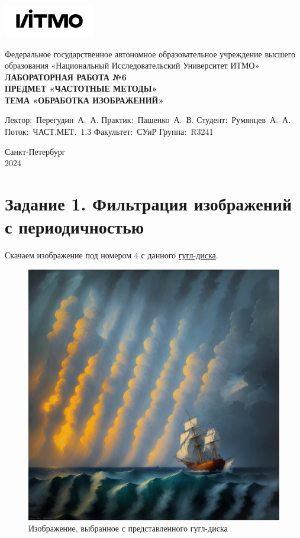 \documentclass[a4paper, 12pt]{article}
\begin{document}
    \begin{titlepage}

        \begin{center}
        \includegraphics[width=0.3\textwidth]{itmo.png} %
        \vfill

        Федеральное государственное автономное образовательное учреждение высшего образования
        «Национальный Исследовательский Университет ИТМО»\\

        \vfill
        {\large\bf ЛАБОРАТОРНАЯ РАБОТА №6}\\
        {\large\bf ПРЕДМЕТ «ЧАСТОТНЫЕ МЕТОДЫ»}\\
        {\large\bf ТЕМА «ОБРАБОТКА ИЗОБРАЖЕНИЙ»}
        \vfill

        \begin{flushright}
            \begin{minipage}{.45\textwidth}
            {
                \hbox{Лектор: Перегудин А. А.}
                \hbox{Практик: Пашенко А. В.}
                \hbox{Студент: Румянцев А. А.}
                \hbox{Поток: ЧАСТ.МЕТ. 1.3}
                \hbox{}
                \hbox{Факультет: СУиР}
                \hbox{Группа: R3241}
            }
            \end{minipage}
        \end{flushright}

        \vfill

        Санкт-Петербург\\
        2024
        \end{center}
    \end{titlepage}

    \tableofcontents

    \newpage
    \section{Задание 1. Фильтрация изображений с периодичностью}
    Скачаем изображение под номером 4 с данного \href{https://drive.google.com/drive/folders/1oewu85taKvyxAUhXNH48ImTFtI1SpFag}{гугл-диска}.
    \begin{figure}[H]
        \centering
        \includegraphics[width=0.45\linewidth]{4.png}
        \captionsetup{skip=0pt}
        \caption{Изображение, выбранное с представленного гугл-диска}
        \label{fig:4dotpng}
    \end{figure}
\end{document}
